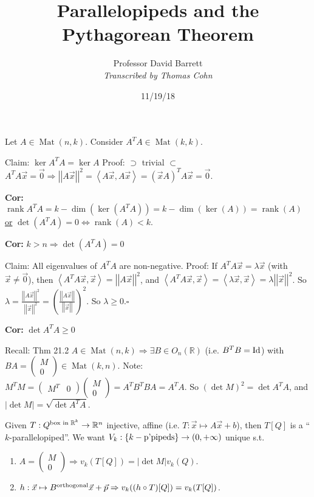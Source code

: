 \documentclass[10pt,letterpaper]{article}
\author{Professor David Barrett\\ \small\textit{Transcribed by Thomas Cohn}}
\title{Parallelopipeds and the Pythagorean Theorem}
\date{11/19/18} %
\newcommand{\n}{\hfill\break}
\newcommand{\cor}[1]{\par\noindent\settowidth{\hangindent}{\textbf{Cor: }}\textbf{Cor: }#1\n}
\newcommand{\proven}{\;$\square$\n}
\newcommand{\ptxt}[1]{\textrm{\textnormal{#1}}}
\newcommand{\set}[1]{\left\{#1\right\}}
\newcommand{\reals}{\mathbb{R}}
\newcommand{\R}{\reals}
\newcommand{\abs}[1]{\left|#1\right|}
\newcommand{\of}{\circ}
\newcommand{\Id}{\textrm{\textnormal{Id}}}
\newcommand{\norm}[1]{\abs{\abs{#1}}}
\newcommand{\tpose}{^{T}}
\newcommand{\iprod}[1]{\left<#1\right>}
\DeclareMathOperator{\Mat}{Mat}
\DeclareMathOperator{\rank}{rank}
\newcommand{\st}{s.t.}
\newcommand{\paren}[1]{\left(#1\right)}
\begin{document}
\maketitle
\setlength\RaggedRightParindent{\parindent}
\RaggedRight

\par\noindent Let $A\in\Mat(n,k)$. Consider $A\tpose{}A\in\Mat(k,k)$.\n

\par\noindent Claim: $\ker{}A\tpose{}A=\ker{}A$\n
Proof: $\supset$ trivial\n
\phantom{Proof: }$\subset$ $A\tpose{}A\vec{x}=\vec{0}\Rightarrow\norm{A\vec{x}}^{2}=\iprod{A\vec{x},A\vec{x}}=(\vec{x}A)\tpose{}A\vec{x}=\vec{0}$.

\cor{$\rank{}A\tpose{}A=k-\dim(\ker(A\tpose{}A))=k-\dim(\ker(A))=\rank(A)$\n
\underline{or} $\det(A\tpose{}A)=0\Leftrightarrow\rank(A)<k$.}

\cor{$k>n\Rightarrow\det(A\tpose{}A)=0$}

\par\noindent Claim: All eigenvalues of $A\tpose{}A$ are non-negative.\n
Proof: If $A\tpose{}A\vec{x}=\lambda\vec{x}$ (with $\vec{x}\ne\vec{0}$), then $\iprod{A\tpose{}A\vec{x},\vec{x}}=\norm{A\vec{x}}^{2}$, and $\iprod{A\tpose{}A\vec{x},\vec{x}}=\iprod{\lambda\vec{x},\vec{x}}=\lambda\norm{\vec{x}}^{2}$.\n
So $\lambda=\frac{\norm{A\vec{x}}^{2}}{\norm{\vec{x}}^{2}}=\paren{\frac{\norm{A\vec{x}}}{\norm{\vec{x}}}}^{2}$. So $\lambda\ge{}0$.\proven

\cor{$\det{}A\tpose{}A\ge{}0$}

\par\noindent Recall: Thm 21.2 $A\in\Mat(n,k)\Rightarrow\exists{}B\in{}O_{n}(\R)$ (i.e. $B\tpose{}B=\Id$) with $BA=\paren{\begin{array}{c}M\\ 0\end{array}}\in\Mat(k,n)$.\n
Note: $M\tpose{}M=\paren{\begin{array}{cc}M\tpose & 0\end{array}}\paren{\begin{array}{c}M\\ 0\end{array}}=A\tpose{}B\tpose{}BA=A\tpose{}A$.\n
So $(\det{}M)^{2}=\det{}A\tpose{}A$, and $\abs{\det{}M}=\sqrt{\det{}A\tpose{}A}$.\n

\par\noindent Given $T:Q^{\ptxt{box in }\R^{k}}\to\R^{n}$ injective, affine (i.e. $T:\vec{x}\mapsto{}A\vec{x}+b$), then $T[Q]$ is a ``$k$-parallelopiped''.\n
We want $V_{k}:\set{k-\ptxt{p'pipeds}}\to(0,+\infty)$ unique \st{}
\begin{enumerate}[label=(\arabic*)]
	\item $A=\paren{\begin{array}{c}M\\ 0\end{array}}\Rightarrow{}v_{k}(T[Q])=\abs{\det{M}}v_{k}(Q)$.
	\item $h:\vec{x}\mapsto{}B^{\ptxt{orthogonal}}\vec{x}+\vec{p}\Rightarrow{}v_{k}((h\of{}T)[Q])=v_{k}(T[Q])$.
\end{enumerate}
\end{document}
